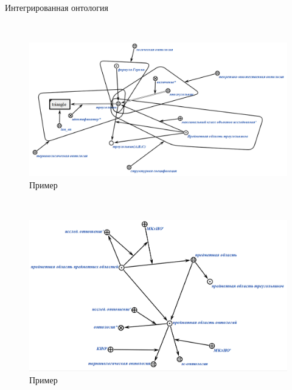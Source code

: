 \begin{frame}{\\Интегрированная онтология}
	\begin{SCn}
		
	\end{SCn}
\end{frame}

\begin{frame}{\\}
	\begin{figure}[H]
	\includegraphics[scale=0.3]{./part1/pictures/ontology1.png}
	\caption{Пример}
	\end{figure}
\end{frame}

\begin{frame}{\\}
	\begin{figure}[H]
		\includegraphics[scale=0.3]{./part1/pictures/ontology2.png}
		\caption{Пример}
	\end{figure}
\end{frame}

